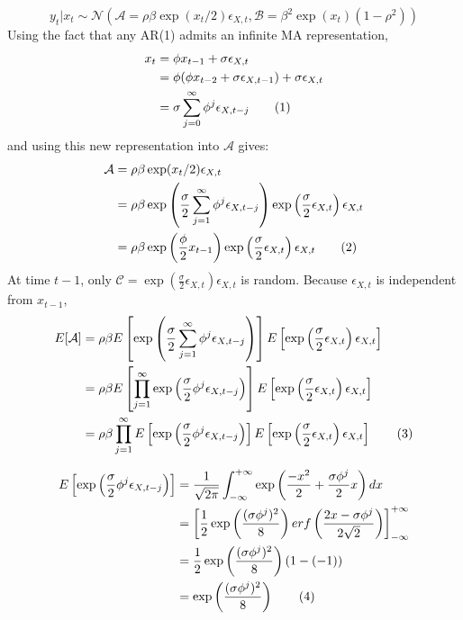 \documentclass[11pt,a4,twosided,singlespacing,titlepagenumber=on]{scrreprt}
\numberwithin{equation}{chapter} %
\theoremstyle{remark}
\newcommand\numberthis{\addtocounter{equation}{1}\tag{\theequation}}
\begin{document}
\begin{equation}
y_t | x_t \sim \mathcal{N}\left(\mathcal{A} = \rho \beta \exp(x_t / 2) \epsilon_{X,t}, \mathcal{B} = \beta^2 \exp(x_t) (1-\rho^2)\right)
\end{equation}
Using the fact that any AR(1) admits an infinite MA representation,
\begin{align*}
x_t &= \phi x_{t-1} + \sigma \epsilon_{X,t} \\ 
  &= \phi(\phi x_{t-2} +\sigma \epsilon_{X,t-1}) + \sigma \epsilon_{X,t} \\
    &= \sigma \sum_{j=0}^\infty \phi^j \epsilon_{X, t-j} \numberthis
\end{align*}
and using this new representation into $\mathcal{A}$ gives:
\begin{align*}
\mathcal{A} &= \rho \beta \exp(x_t / 2) \epsilon_{X,t} \\
			&= \rho \beta \exp \left( \frac{\sigma}{2} \sum_{j=1}^\infty \phi^j \epsilon_{X, t-j}\right) \exp \left( \frac{\sigma}{2} \epsilon_{X,t} \right) \epsilon_{X,t} \\
			&= \rho \beta \exp \left( \frac{\phi}{2} x_{t-1}\right) \exp \left( \frac{\sigma}{2} \epsilon_{X,t} \right) \epsilon_{X,t} \numberthis
\end{align*}
At time $t-1$, only $\mathcal{C} = \exp \left( \frac{\sigma}{2} \epsilon_{X,t} \right) \epsilon_{X,t}$ is random. Because $\epsilon_{X,t}$ is independent from $x_{t-1}$,
\begin{align*}
E[\mathcal{A}] &= \rho \beta E\left[\exp \left( \frac{\sigma}{2} \sum_{j=1}^\infty \phi^j \epsilon_{X, t-j}\right)\right] E\left[\exp \left( \frac{\sigma}{2} \epsilon_{X,t} \right) \epsilon_{X,t} \right] \\
			   &= \rho \beta E\left[\prod_{j=1}^\infty \exp \left( \frac{\sigma}{2} \phi^j \epsilon_{X, t-j} \right)  \right] E\left[\exp \left( \frac{\sigma}{2} \epsilon_{X,t} \right) \epsilon_{X,t} \right] \\
			   &= \rho \beta \prod_{j=1}^\infty E\left[\exp \left( \frac{\sigma}{2} \phi^j \epsilon_{X, t-j} \right)  \right]  E\left[\exp \left( \frac{\sigma}{2} \epsilon_{X,t} \right) \epsilon_{X,t} \right] \numberthis
\end{align*}

\begin{align*}
E\left[\exp \left( \frac{\sigma}{2} \phi^j \epsilon_{X, t-j} \right) \right] &= \frac{1}{\sqrt{2\pi}} \int^{+\infty}_{-\infty} \exp \left(\frac{-x^2}{2} + \frac{\sigma \phi^j}{2} x \right) dx \\
																			 &= \left[ \frac{1}{2} \exp \left(\frac{(\sigma\phi^j)^2}{8} \right) erf \left( \frac{2x- \sigma\phi^j}{2 \sqrt{2}} \right) \right]^{+\infty}_{-\infty} \\
																			 &= \frac{1}{2} \exp \left(\frac{(\sigma\phi^j)^2}{8} \right) (1 - (-1)) \\
																			 &= \exp \left(\frac{(\sigma\phi^j)^2}{8} \right) \numberthis
\end{align*}
\end{document}

